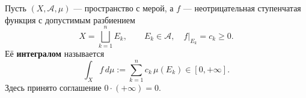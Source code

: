 \label{definition:23}

\begin{definition}
Пусть $(X,\mathcal A,\mu)$ --- пространство с мерой, а $f$ --- неотрицательная ступенчатая функция с допустимым разбиением
\[
  X=\bigsqcup_{k=1}^{n}E_k,
  \qquad E_k\in\mathcal A,\quad f|_{E_k}=c_k\ge0.
\]
Её \textbf{интегралом} называется
\[
  \int_X f\,d\mu:=\sum_{k=1}^{n}c_k\,\mu(E_k)\in[0,+\infty].
\]
Здесь принято соглашение $0\cdot(+\infty)=0$.
\end{definition}
